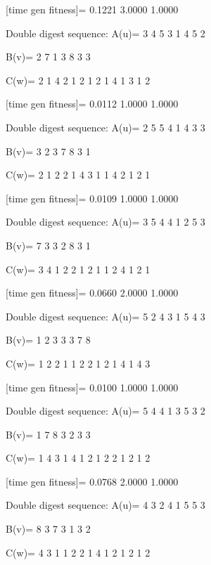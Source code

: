 [time gen fitness]=
    0.1221    3.0000    1.0000

Double digest sequence:
A(u)=
     3     4     5     3     1     4     5     2

B(v)=
     2     7     1     3     8     3     3

C(w)=
     2     1     4     2     1     2     1     2     1     4     1     3     1     2

[time gen fitness]=
    0.0112    1.0000    1.0000

Double digest sequence:
A(u)=
     2     5     5     4     1     4     3     3

B(v)=
     3     2     3     7     8     3     1

C(w)=
     2     1     2     2     1     4     3     1     1     4     2     1     2     1

[time gen fitness]=
    0.0109    1.0000    1.0000

Double digest sequence:
A(u)=
     3     5     4     4     1     2     5     3

B(v)=
     7     3     3     2     8     3     1

C(w)=
     3     4     1     2     2     1     2     1     1     2     4     1     2     1

[time gen fitness]=
    0.0660    2.0000    1.0000

Double digest sequence:
A(u)=
     5     2     4     3     1     5     4     3

B(v)=
     1     2     3     3     3     7     8

C(w)=
     1     2     2     1     1     2     2     1     2     1     4     1     4     3

[time gen fitness]=
    0.0100    1.0000    1.0000

Double digest sequence:
A(u)=
     5     4     4     1     3     5     3     2

B(v)=
     1     7     8     3     2     3     3

C(w)=
     1     4     3     1     4     1     2     1     2     2     1     2     1     2

[time gen fitness]=
    0.0768    2.0000    1.0000

Double digest sequence:
A(u)=
     4     3     2     4     1     5     5     3

B(v)=
     8     3     7     3     1     3     2

C(w)=
     4     3     1     1     2     2     1     4     1     2     1     2     1     2

